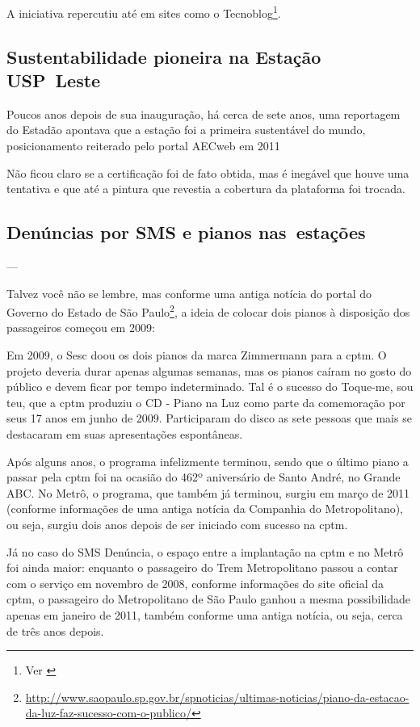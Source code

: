 \documentclass[11pt,fleqn]{book} %
\begin{document}
A iniciativa repercutiu até em sites como o Tecnoblog\footnote{Ver \cite{higa2017}}.

\subsection{Sustentabilidade pioneira na Estação USP Leste}

Poucos anos depois de sua inauguração, há cerca de sete anos, uma reportagem do Estadão apontava que a estação foi a primeira sustentável do mundo, posicionamento reiterado pelo portal AECweb em 2011


Não ficou claro se a certificação foi de fato obtida, mas é inegável que houve uma tentativa e que até a pintura que revestia a cobertura da plataforma foi trocada.

\subsection{Denúncias por SMS e pianos nas estações}

---

Talvez você não se lembre, mas conforme uma antiga notícia do portal do Governo do Estado de São Paulo\footnote{\url{http://www.saopaulo.sp.gov.br/spnoticias/ultimas-noticias/piano-da-estacao-da-luz-faz-sucesso-com-o-publico/}}, a ideia de colocar dois pianos à disposição dos passageiros começou em 2009:

\begin{citacao}
	Em 2009, o Sesc doou os dois pianos da marca Zimmermann para a \gls{cptm}. O projeto deveria durar apenas algumas semanas, mas os pianos caíram no gosto do público e devem ficar por tempo indeterminado. Tal é o sucesso do Toque-me, sou teu, que a \gls{cptm} produziu o CD - Piano na Luz como parte da comemoração por seus 17 anos em junho de 2009. Participaram do disco as sete pessoas que mais se destacaram em suas apresentações espontâneas.
\end{citacao}

Após alguns anos, o programa infelizmente terminou, sendo que o último piano a passar pela \gls{cptm} foi na ocasião do 462º aniversário de Santo André, no Grande ABC. No Metrô, o programa, que também já terminou, surgiu em março de 2011 (conforme informações de uma antiga notícia da Companhia do Metropolitano), ou seja, surgiu dois anos depois de ser iniciado com sucesso na \gls{cptm}.

Já no caso do SMS Denúncia, o espaço entre a implantação na \gls{cptm} e no Metrô foi ainda maior: enquanto o passageiro do Trem Metropolitano passou a contar com o serviço em novembro de 2008, conforme informações do site oficial da \gls{cptm}, o passageiro do Metropolitano de São Paulo ganhou a mesma possibilidade apenas em janeiro de 2011, também conforme uma antiga notícia, ou seja, cerca de três anos depois.
\end{document}
